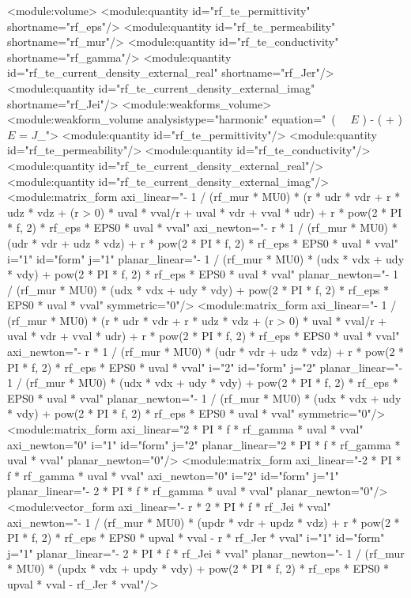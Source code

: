 \documentclass[12pt,a4paper,oneside]{article}
\numberwithin{equation}{section} %
\numberwithin{figure}{section} %
\numberwithin{table}{section} %
\newcommand{\mj}{\mathrm{j}} %
\newcommand{\vecfaz}[1]{\mbox{\underline{\boldmath$#1$}}} %
\newcommand{\curl}{\mathrm{curl}\ }
\begin{document}
\begin{spverbatim}
  <module:volume>
    <module:quantity id="rf_te_permittivity" shortname="rf_eps"/>
    <module:quantity id="rf_te_permeability" shortname="rf_mur"/>
    <module:quantity id="rf_te_conductivity" shortname="rf_gamma"/>
    <module:quantity id="rf_te_current_density_external_real" shortname="rf_Jer"/>
    <module:quantity id="rf_te_current_density_external_imag" shortname="rf_Jei"/>
    <module:weakforms_volume>
      <module:weakform_volume analysistype="harmonic" equation="\curl \left( \, \curl \vecfaz{E} \right) - \mj \omega \left( \sigma + \mj \omega \varepsilon \right) \vecfaz{E} = \mj \omega \vecfaz{J}_{}">
        <module:quantity id="rf_te_permittivity"/>
        <module:quantity id="rf_te_permeability"/>
        <module:quantity id="rf_te_conductivity"/>
        <module:quantity id="rf_te_current_density_external_real"/>
        <module:quantity id="rf_te_current_density_external_imag"/>
        <module:matrix_form axi_linear="- 1 / (rf_mur * MU0) * (r * udr * vdr + r * udz * vdz + (r > 0) * uval * vval/r + uval * vdr + vval * udr) + r * pow(2 * PI * f, 2) * rf_eps * EPS0 * uval * vval" axi_newton="- r * 1 / (rf_mur * MU0) * (udr * vdr + udz * vdz) + r * pow(2 * PI * f, 2) * rf_eps * EPS0 * uval * vval" i="1" id="form" j="1" planar_linear="- 1 / (rf_mur * MU0) * (udx * vdx + udy * vdy) + pow(2 * PI * f, 2) * rf_eps * EPS0 * uval * vval" planar_newton="- 1 / (rf_mur * MU0) * (udx * vdx + udy * vdy) + pow(2 * PI * f, 2) * rf_eps * EPS0 * uval * vval" symmetric="0"/>
        <module:matrix_form axi_linear="- 1 / (rf_mur * MU0) * (r * udr * vdr + r * udz * vdz + (r > 0) * uval * vval/r + uval * vdr + vval * udr) + r * pow(2 * PI * f, 2) * rf_eps * EPS0 * uval * vval" axi_newton="- r * 1 / (rf_mur * MU0) * (udr * vdr + udz * vdz) + r * pow(2 * PI * f, 2) * rf_eps * EPS0 * uval * vval" i="2" id="form" j="2" planar_linear="- 1 / (rf_mur * MU0) * (udx * vdx + udy * vdy) + pow(2 * PI * f, 2) * rf_eps * EPS0 * uval * vval" planar_newton="- 1 / (rf_mur * MU0) * (udx * vdx + udy * vdy) + pow(2 * PI * f, 2) * rf_eps * EPS0 * uval * vval" symmetric="0"/>
        <module:matrix_form axi_linear="2 * PI * f * rf_gamma * uval * vval" axi_newton="0" i="1" id="form" j="2" planar_linear="2 * PI * f * rf_gamma * uval * vval" planar_newton="0"/>
        <module:matrix_form axi_linear="-2 * PI * f * rf_gamma * uval * vval" axi_newton="0" i="2" id="form" j="1" planar_linear="- 2 * PI * f * rf_gamma * uval * vval" planar_newton="0"/>
        <module:vector_form axi_linear="- r * 2 * PI * f * rf_Jei * vval" axi_newton="- 1 / (rf_mur * MU0) * (updr * vdr + updz * vdz) + r * pow(2 * PI * f, 2) * rf_eps * EPS0 * upval * vval - r * rf_Jer * vval" i="1" id="form" j="1" planar_linear="- 2 * PI * f * rf_Jei * vval" planar_newton="- 1 / (rf_mur * MU0) * (updx * vdx + updy * vdy) + pow(2 * PI * f, 2) * rf_eps * EPS0 * upval * vval - rf_Jer * vval"/>

\end{spverbatim}
\end{document}

